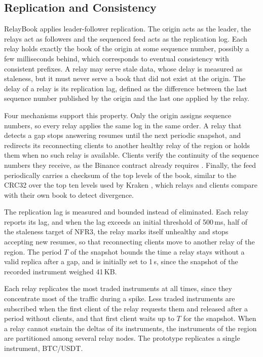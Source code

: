 \documentclass[conference]{IEEEtran}
\begin{document}
\subsection{Replication and Consistency}
\label{sec:replication}

RelayBook applies leader-follower replication. The origin acts as the leader, the relays act as followers and the sequenced feed acts as the replication log. Each relay holds exactly the book of the origin at some sequence number, possibly a few milliseconds behind, which corresponds to eventual consistency with consistent prefixes. A relay may serve stale data, whose delay is measured as staleness, but it must never serve a book that did not exist at the origin. The delay of a relay is its replication lag, defined as the difference between the last sequence number published by the origin and the last one applied by the relay.

Four mechanisms support this property. Only the origin assigns sequence numbers, so every relay applies the same log in the same order. A relay that detects a gap stops answering resumes until the next periodic snapshot, and redirects its reconnecting clients to another healthy relay of the region or holds them when no such relay is available. Clients verify the continuity of the sequence numbers they receive, as the Binance contract already requires \cite{binance-localbook}. Finally, the feed periodically carries a checksum of the top levels of the book, similar to the CRC32 over the top ten levels used by Kraken \cite{kraken-book}, which relays and clients compare with their own book to detect divergence.

The replication lag is measured and bounded instead of eliminated. Each relay reports its lag, and when the lag exceeds an initial threshold of 500\,ms, half of the staleness target of NFR3, the relay marks itself unhealthy and stops accepting new resumes, so that reconnecting clients move to another relay of the region. The period $T$ of the snapshot bounds the time a relay stays without a valid replica after a gap, and is initially set to 1\,s, since the snapshot of the recorded instrument weighed 41\,KB.

Each relay replicates the most traded instruments at all times, since they concentrate most of the traffic during a spike. Less traded instruments are subscribed when the first client of the relay requests them and released after a period without clients, and that first client waits up to $T$ for the snapshot. When a relay cannot sustain the deltas of its instruments, the instruments of the region are partitioned among several relay nodes. The prototype replicates a single instrument, BTC/USDT.
\end{document}
